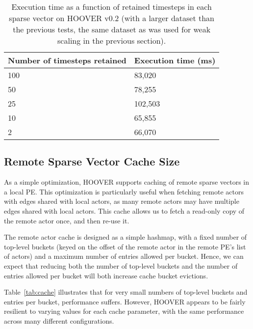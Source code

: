 \begin{table}
\centering
\begin{tabularx}{\textwidth}{ | X | X | }
\hline
Number of timesteps retained & Execution time (ms) \\\hline
100 & 83,020 \\\hline
50  & 78,255 \\\hline
25  & 102,503 \\\hline
10  & 65,855 \\\hline
2   & 66,070 \\\hline
\end{tabularx}
\caption{Execution time as a function of retained timesteps in each sparse
    vector on HOOVER v0.2 (with a larger dataset than the previous tests, the
    same dataset as was used for weak scaling in the previous section).}
\label{tab:timesteps_retained2}
\end{table}

\subsection{Remote Sparse Vector Cache Size}

As a simple optimization, HOOVER supports caching of remote sparse vectors in a
local PE. This optimization is particularly useful when fetching remote actors
with edges shared with local actors, as many remote actors may have multiple
edges shared with local actors. This cache allows us to fetch a read-only copy
of the remote actor once, and then re-use it.

The remote actor cache is designed as a simple hashmap, with a fixed number of
top-level buckets (keyed on the offset of the remote actor in the remote PE's
list of actors) and a maximum number of entries allowed per bucket. Hence, we
can expect that reducing both the number of top-level buckets and the number of
entries allowed per bucket will both increase cache bucket evictions.

Table~\ref{tab:cache} illustrates that for very small numbers of
top-level buckets and entries per bucket, performance suffers. However, HOOVER
appears to be fairly resilient to varying values for each cache parameter, with
the same performance across many different configurations.

